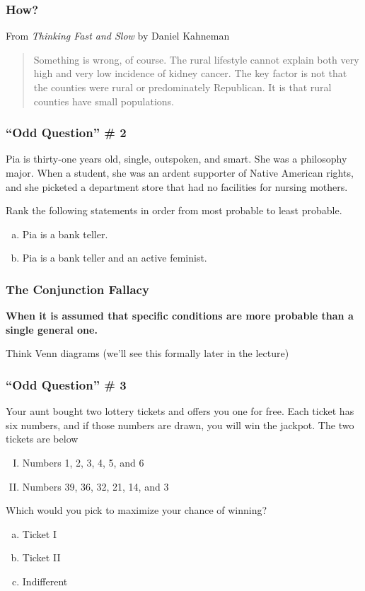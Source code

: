 \documentclass{beamer}
\begin{document}
\begin{frame}
\frametitle{How?}
From \textit{Thinking Fast and Slow} by Daniel Kahneman
    \begin{quote}
        Something is wrong, of course. The rural lifestyle cannot explain both very high and very low 
        incidence of kidney cancer. The key factor is not that the counties were rural or predominately 
        Republican. \alert{It is that rural counties have small populations.}
    \end{quote}
\end{frame}

\begin{frame}
\frametitle{``Odd Question'' \# 2}
	Pia is thirty-one years old, single, outspoken, and smart. She was a philosophy major. When a 
	student, she was an ardent supporter of Native American rights, and she picketed a department 
	store that had no facilities for nursing mothers. 

    \vspace{1em}
    Rank the following statements in order from most probable to least probable.
	\begin{enumerate}[(a)]
		\item Pia is a bank teller.
		\item Pia is a bank teller and an active feminist.
	\end{enumerate}
\end{frame}

\begin{frame}
\frametitle{The Conjunction Fallacy}
    \textbf{When it is assumed that specific conditions are more probable than a single general one.}

    Think Venn diagrams (we'll see this formally later in the lecture)
\end{frame}

\begin{frame}
\frametitle{``Odd Question'' \# 3}
	Your aunt bought two lottery tickets and offers you one for free. Each ticket has six numbers, and if those numbers are drawn, you will win the jackpot. The two tickets are below
	\begin{enumerate}[I.]
		\item Numbers 1, 2, 3, 4, 5, and 6
		\item Numbers 39, 36, 32, 21, 14, and 3
	\end{enumerate}
	\vspace{1em}
	Which would you pick to maximize your chance of winning?
	\begin{enumerate}[(a)]
		\item Ticket I
		\item Ticket II
		\item Indifferent
	\end{enumerate}
\end{frame}
\end{document}
